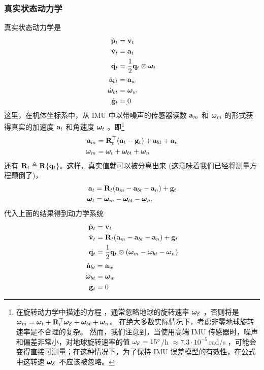 \subsubsection{真实状态动力学}

真实状态动力学是
%
\begin{subequations}
%
\begin{align}
\dot{{\bf p}}_t &= {\bf v}_t \\
\dot{{\bf v}}_t &= {\bf a}_t \\
\dot{{\bf q}_t} &= \frac{1}{2}{\bf q}_t\otimes{\bm \omega}_t \\
\dot{{\bf a}}_{bt} &= {\bf a}_w \\
\dot{{\bm \omega}}_{bt} &= {\bm \omega}_w \\
\dot{{\bf g}}_t &= 0
\end{align}%
\end{subequations}
%
这里，在机体坐标系中，从 IMU 中以带噪声的传感器读数 ${\bf a}_m$ 和 ${\bm \omega}_m$ 的形式获得真实的加速度 ${\bf a}_t$ 和角速度 ${\bm \omega}_t$ 。即\footnote{在旋转动力学中描述的方程 ，通常忽略地球的旋转速率 ${\bm \omega}_{\mathcal{E}}$ ，否则将是 ${\bm \omega}_m = {\bm \omega}_t + {\bf R}_t^{\top}{\bm \omega}_{\mathcal{E}} + {\bm \omega}_{bt} + {\bm \omega}_n$。
在绝大多数实际情况下，考虑非零地球旋转速率是不合理的复杂。
然而，我们注意到，当使用高端 IMU 传感器时，噪声和偏差非常小，对地球旋转速率的值 $\omega_{\mathcal{E}}=15^\circ$/h $\approx 7.3\cdot10^{-5}\,$rad/s ，可能会变得直接可测量；在这种情况下，为了保持 IMU 误差模型的有效性，在公式中这转速 ${\bm \omega}_{\mathcal{E}}$ 不应该被忽略。}
%
%
\begin{align}
{\bf a}_m &= {\bf R}_t^{\top}({\bf a}_t - {\bf g}_t) + {\bf a}_{bt} + {\bf a}_n \\
{\bm \omega}_m &= {\bm \omega}_t + {\bm \omega}_{bt} + {\bm \omega}_n \label{equ:gyroModel}
\end{align}%
%
还有 ${\bf R}_t\triangleq{\bf R}\{{\bf q}_t\}$。这样，真实值就可以被分离出来 (这意味着我们已经将测量方程颠倒了)，
%
%
\begin{align}
{\bf a}_t &= {\bf R}_t({\bf a}_m - {\bf a}_{bt} - {\bf a}_n) + {\bf g}_t \\
{\bm \omega}_t &= {\bm \omega}_m - {\bm \omega}_{bt} - {\bm \omega}_n.
\end{align}%
%
代入上面的结果得到动力学系统
%
\begin{subequations}
%
\begin{align}
\dot{{\bf p}}_t &= {\bf v}_t \label{equ:pos} \\
\dot{{\bf v}}_t &= {\bf R}_t({\bf a}_m - {\bf a}_{bt} - {\bf a}_n) + {\bf g}_t \label{equ:vel} \\
\dot{{\bf q}_t} &= \frac{1}{2}{\bf q}_t\otimes({\bm \omega}_m - {\bm \omega}_{bt} - {\bm \omega}_n) \label{equ:quat}\\
\dot{{\bf a}}_{bt} &= {\bf a}_w \label{equ:abias}\\
\dot{{\bm \omega}}_{bt} &= {\bm \omega}_w \label{equ:wbias}\\
\dot{{\bf g}}_t &= 0 \label{equ:grav}
\end{align}%
\end{subequations}
